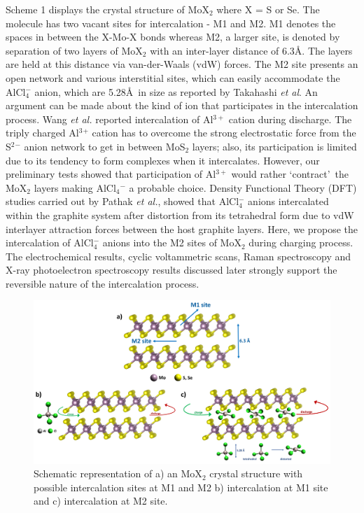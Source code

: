 \documentclass[num-refs]{wiley-article}
\begin{document}
Scheme 1 displays the crystal structure of MoX$_2$ where X = S or Se. The molecule has two vacant sites for intercalation - M1 and M2. M1 denotes the spaces in between the X-Mo-X bonds whereas M2, a larger site, is denoted by separation of two layers of MoX$_2$ with an inter-layer distance of 6.3\AA. The layers are held at this distance via van-der-Waals (vdW) forces. The M2 site presents an open network and various interstitial sites, which can easily accommodate the AlCl$_4^{-}$ anion, which are 5.28\AA\ in size as reported by Takahashi {\it et al}. An argument can be made about the kind of ion that participates in the intercalation process. Wang {\it et al.}\cite{li_rechargeable_2018} reported intercalation of Al$^{3+}$ cation during discharge. The triply charged Al$^3{^+}$ cation has to overcome the strong electrostatic force from the S$^2{^-}$ anion network to get in between MoS$_2$ layers; also, its participation is limited due to its tendency to form complexes when it intercalates. However, our preliminary tests showed  that participation of Al$^{3+}$ would rather \lq contract\rq\ the MoX$_2$ layers making AlCl$_4{^-}$ a probable choice.  Density Functional Theory (DFT) studies carried out by Pathak {\it et al.}, showed that AlCl$_4^-$ anions intercalated within the graphite system after distortion from its tetrahedral form due to vdW interlayer attraction forces between the host graphite layers. Here, we propose the intercalation of AlCl$_4^-$ anions into the M2 sites of MoX$_2$ during charging process. The electrochemical results, cyclic voltammetric scans, Raman spectroscopy and X-ray photoelectron spectroscopy results discussed later strongly support the reversible nature of the intercalation process.

\begin{figure}[t]
\centering
\includegraphics[width=\textwidth]{figures/S1}
\caption{Schematic representation of a) an MoX$_2$ crystal structure with possible intercalation sites at M1 and M2 b) intercalation at M1 site and c) intercalation at M2 site.}
\end{figure}
\end{document}
